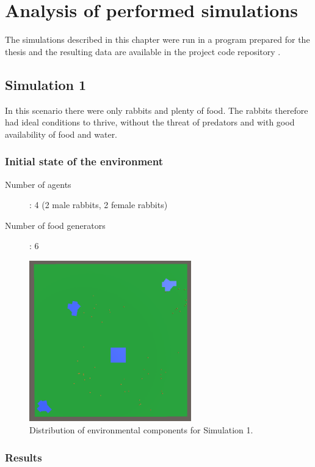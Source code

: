 \chapter{Analysis of performed simulations}
The simulations described in this chapter were run in a program prepared for the thesis and the resulting data are available in the project code repository \cite{SimulationsResults}.

\section{Simulation 1}
In this scenario there were only rabbits and plenty of food. The rabbits therefore had ideal conditions to thrive, without the threat of predators and with good availability of food and water.
\subsection{Initial state of the environment}
\begin{description}
    \item[Number of agents]: 4 (2 male rabbits, 2 female rabbits)
    \item[Number of food generators]: 6
\end{description}

\begin{figure}[H]
    \centering
    \includegraphics[width=7cm]{Images/Area_Simulation_7_only_rabbits_lot_of_food.png}
    \caption{Distribution of environmental components for Simulation 1.}
    \label{fig:simulation1EnvLayout}
\end{figure}

\subsection{Results}

